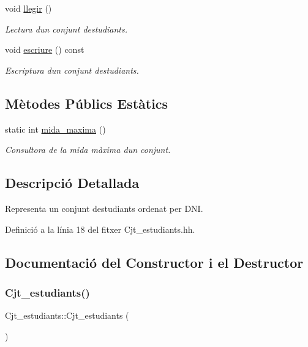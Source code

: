 \begin{DoxyCompactItemize}
void \hyperlink{class_cjt__estudiants_aa24c2d4c36167b2b810ab459435b67a8}{llegir} ()
\begin{DoxyCompactList}\small\item\em Lectura d\textquotesingle{}un conjunt d\textquotesingle{}estudiants. \end{DoxyCompactList}\item 
void \hyperlink{class_cjt__estudiants_a2c25dbd33850025de3389617712f896a}{escriure} () const
\begin{DoxyCompactList}\small\item\em Escriptura d\textquotesingle{}un conjunt d\textquotesingle{}estudiants. \end{DoxyCompactList}\end{DoxyCompactItemize}
\subsection*{Mètodes Públics Estàtics}
\begin{DoxyCompactItemize}
\item 
static int \hyperlink{class_cjt__estudiants_a171fdff58b408ccbf647ab594b5eafa4}{mida\+\_\+maxima} ()
\begin{DoxyCompactList}\small\item\em Consultora de la mida màxima d\textquotesingle{}un conjunt. \end{DoxyCompactList}\end{DoxyCompactItemize}


\subsection{Descripció Detallada}
Representa un conjunt d\textquotesingle{}estudiants ordenat per D\+NI. 

Definició a la línia 18 del fitxer Cjt\+\_\+estudiants.\+hh.



\subsection{Documentació del Constructor i el Destructor}
\mbox{\label{class_cjt__estudiants_a31ffe72cadcf58d82c8b9f6659c56e7a}} 
\subsubsection{\texorpdfstring{Cjt\+\_\+estudiants()}{Cjt\_estudiants()}}
{\footnotesize\ttfamily Cjt\+\_\+estudiants\+::\+Cjt\+\_\+estudiants (\begin{DoxyParamCaption}{ }\end{DoxyParamCaption})}



